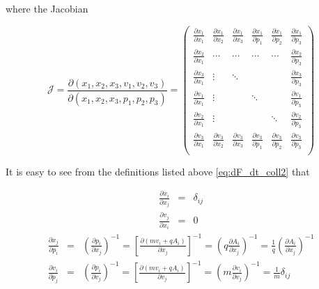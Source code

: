 \documentclass[11pt,titlepage]{report}
\begin{document}
\noindent where the Jacobian

\begin{equation}\mathcal{J} = \frac{\partial (x_{1},x_{2},x_{3},v_{1},v_{2},v_{3})}{\partial (x_{1},x_{2},x_{3},p_{1},p_{2},p_{3})} = \begin{pmatrix}
       \frac{\partial x_1}{\partial x_1} & \frac{\partial x_1}{\partial x_2} & \frac{\partial x_1}{\partial x_3} & \frac{\partial x_1}{\partial p_1} & \frac{\partial x_1}{\partial p_2} & \frac{\partial x_1}{\partial p_3}  \\[0.3em]
           \frac{\partial x_2}{\partial x_1} & \cdots & \cdots & \cdots & \cdots & \frac{\partial x_2}{\partial p_3} \\[0.3em]
           \frac{\partial x_3}{\partial x_1} & \vdots &\ddots && & \frac{\partial x_3}{\partial p_3} \\[0.3em]
           \frac{\partial v_1}{\partial x_1} &\vdots & &\ddots & & \frac{\partial v_1}{\partial p_3} \\[0.3em]
           \frac{\partial v_2}{\partial x_1} &\vdots &&&\ddots  & \frac{\partial v_2}{\partial p_3} \\[0.3em]
           \frac{\partial v_3}{\partial x_1} &\frac{\partial v_3}{\partial x_2} &\frac{\partial v_3}{\partial x_3} &\frac{\partial v_3}{\partial p_1}&\frac{\partial v_3}{\partial p_2} & \frac{\partial v_3}{\partial p_3} \\[0.3em]

     \end{pmatrix}\nonumber \end{equation}

\noindent It is easy to see from the definitions listed above \eqref{eq:dF_dt_coll2} that

\begin{eqnarray*}
\frac{\partial x_i}{\partial x_j} & = & \delta_{ij} \\[0.3em]
\frac{\partial v_j}{\partial x_i} & = & 0
\end{eqnarray*}
\begin{eqnarray*}
\frac{\partial x_j}{\partial p_i} & = & \left(\frac{\partial p_i}{\partial x_j}\right)^{-1} = \left[\frac{\partial (mv_i + qA_i)}{\partial x_j}\right]^{-1} = \left(q\frac{\partial A_i}{\partial x_j}\right)^{-1} = \frac{1}{q}\left(\frac{\partial A_i}{\partial x_j}\right)^{-1}\\[0.3em]
\frac{\partial v_i}{\partial p_j} & = & \left(\frac{\partial p_i}{\partial v_j}\right)^{-1} = \left[\frac{\partial (mv_i + qA_i)}{\partial v_j}\right]^{-1} = \left(m \frac{\partial v_i}{\partial v_j}\right)^{-1} =  \frac{1}{m}\delta_{ij}
\end{eqnarray*}
\end{document}
